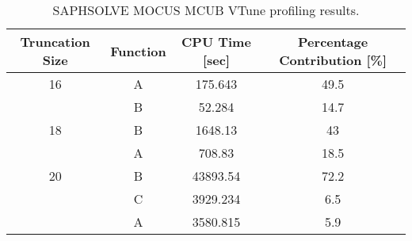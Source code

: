 \begin{table}[htbp]
    \centering
    \caption{SAPHSOLVE MOCUS MCUB VTune profiling results.}
    \label{tab:saphsolve_vtune}
    \begin{tabular}{|c|c|c|c|}
        \hline
        \textbf{Truncation Size} & \textbf{Function} & \textbf{CPU Time [sec]} & \textbf{Percentage Contribution [\%]} \\
        \hline
        16 & A & 175.643 & 49.5 \\
           & B & 52.284 & 14.7 \\
        18 & B & 1648.13 & 43 \\
           & A & 708.83 & 18.5 \\
        20 & B & 43893.54 & 72.2 \\
           & C & 3929.234 & 6.5 \\
           & A & 3580.815 & 5.9 \\
        \hline
    \end{tabular}
\end{table}